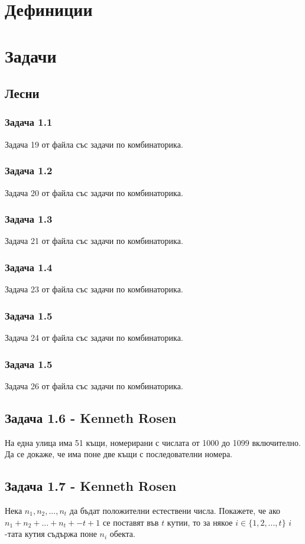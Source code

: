 \documentclass[12pt]{article}
\begin{document}
\section*{Дефиниции}

\section*{Задачи}

\subsection*{Лесни}
\subsubsection*{Задача 1.1}
Задача 19 от файла със задачи по комбинаторика.
\subsubsection*{Задача 1.2}
Задача 20 от файла със задачи по комбинаторика.
\subsubsection*{Задача 1.3}
Задача 21 от файла със задачи по комбинаторика.
\subsubsection*{Задача 1.4}
Задача 23 от файла със задачи по комбинаторика.
\subsubsection*{Задача 1.5}
Задача 24 от файла със задачи по комбинаторика.
\subsubsection*{Задача 1.5}
Задача 26 от файла със задачи по комбинаторика.
\subsection*{Задача 1.6 - Kenneth Rosen}
На една улица има 51 къщи, номерирани с числата от 1000 до 1099 включително. Да се докаже, че има поне две къщи с последователни номера. 
\subsection*{Задача 1.7 - Kenneth Rosen}
Нека $n_1, n_2, ..., n_t$ да бъдат положителни естествени числа. Покажете, че ако $n_1 + n_2 + ... + n_t + - t + 1$ се поставят във $t$ кутии, то за някое $i \in \{ 1, 2, ..., t \}$ $i$-тата кутия съдържа поне $n_i$ обекта.
\end{document}
